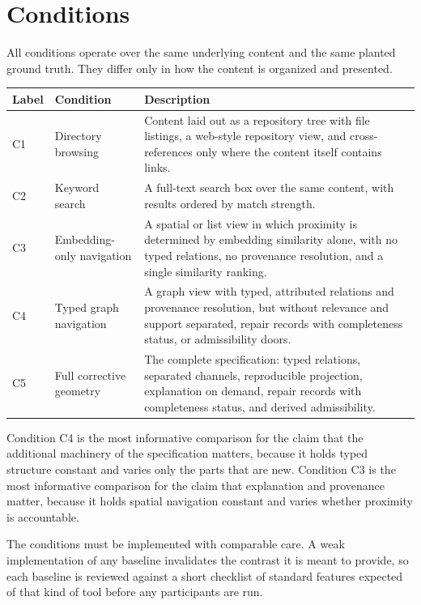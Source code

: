\documentclass[11pt]{article}
\theoremstyle{definition}
\begin{document}
\section{Conditions}
\label{sec:conditions}

All conditions operate over the same underlying content and the same planted ground truth. They differ only in how the content is organized and presented.

\begin{table}[h]
\centering
\small
\begin{tabular}{@{}p{0.9cm}p{3.2cm}p{8.9cm}@{}}
\toprule
Label & Condition & Description\\
\midrule
C1 & Directory browsing & Content laid out as a repository tree with file listings, a web-style repository view, and cross-references only where the content itself contains links.\\
C2 & Keyword search & A full-text search box over the same content, with results ordered by match strength.\\
C3 & Embedding-only navigation & A spatial or list view in which proximity is determined by embedding similarity alone, with no typed relations, no provenance resolution, and a single similarity ranking.\\
C4 & Typed graph navigation & A graph view with typed, attributed relations and provenance resolution, but without relevance and support separated, repair records with completeness status, or admissibility doors.\\
C5 & Full corrective geometry & The complete specification: typed relations, separated channels, reproducible projection, explanation on demand, repair records with completeness status, and derived admissibility.\\
\bottomrule
\end{tabular}
\end{table}

Condition C4 is the most informative comparison for the claim that the additional machinery of the specification matters, because it holds typed structure constant and varies only the parts that are new. Condition C3 is the most informative comparison for the claim that explanation and provenance matter, because it holds spatial navigation constant and varies whether proximity is accountable.

The conditions must be implemented with comparable care. A weak implementation of any baseline invalidates the contrast it is meant to provide, so each baseline is reviewed against a short checklist of standard features expected of that kind of tool before any participants are run.
\end{document}
